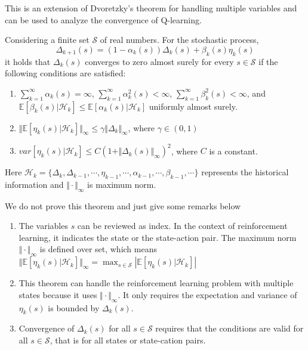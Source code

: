     This is an extension of Dvoretzky's theorem for handling multiple variables and can be used to analyze the convergence
    of Q-learning.
    \begin{theorem}
      Considering a finite set $\mathcal{S}$ of real numbers. For the stochastic process,
      \begin{equation}
        \label{eq:dvo-extension}
        \Delta_{k+1}(s) = (1-\alpha_{k}(s)) \Delta_{k}(s) + \beta_{k}(s)\eta_{k}(s)
      \end{equation}
      it holds that $\Delta_{k}(s)$ converges to zero almost surely for every $s\in \mathcal{S}$ if the following conditions
      are satisfied:
      \begin{enumerate}[label=(\alph*)]
        \item
              $\sum_{k=1}^{\infty} \alpha_{k}(s)=\infty$, $\sum_{k=1}^{\infty} \alpha_{k}^{2}(s)<\infty$, $\sum_{k=1}^{\infty}
                \beta_{k}^{2}(s)<\infty$, and $\mathbb{E}[\beta_{k}(s)|\mathcal{H}_{k}]\le
                \mathbb{E}[\alpha_{k}(s)|\mathcal{H}_{k}]$ uniformly almost surely.
        \item
              $\Vert\mathbb{E}[\eta_{k}(s)|\mathcal{H}_{k}]\Vert_{\infty} \le \gamma\Vert \Delta_{k}\Vert_{\infty}$, where $\gamma
                \in (0,1)$
        \item
              $var[\eta_{k}(s)|\mathcal{H}_{k}] \le C(1+\Vert \Delta_{k}(s)\Vert_{\infty})^{2}$, where $C$ is a constant.
      \end{enumerate}
      Here $\mathcal{H}_{k}=\{\Delta_{k}, \Delta_{k-1},\cdots,\eta_{k-1},\cdots,\alpha_{k-1},\cdots,\beta_{k-1},\cdots\}$
      represents the historical information and $\Vert \cdot \Vert_{\infty}$ is maximum norm.
    \end{theorem}
    We do not prove this theorem and just give some remarks below
    \begin{enumerate}

      \item
            The variables $s$ can be reviewed as index. In the context of reinforcement learning, it indicates the state or the
            state-action pair. The maximum norm $\Vert \cdot \Vert_{\infty}$ is defined over set, which means
            $\Vert\mathbb{E}[\eta_{k}(s)|\mathcal{H}_{k}]\Vert_{\infty}=\max_{s\in
                \mathcal{S}}\left|\mathbb{E}[\eta_{k}(s)|\mathcal{H}_{k}]\right|$
      \item
            This theorem can handle the reinforcement learning problem with multiple states because it uses $\Vert \cdot
              \Vert_{\infty}$. It only requires the expectation and variance of $\eta_{k}(s)$ is bounded by $\Delta_{k}(s)$.
      \item
            Convergence of $\Delta_{k}(s)$ for all $s\in \mathcal{S}$ requires that the conditions are valid for all $s \in
              \mathcal{S}$, that is for all states or state-cation pairs.

    \end{enumerate}

